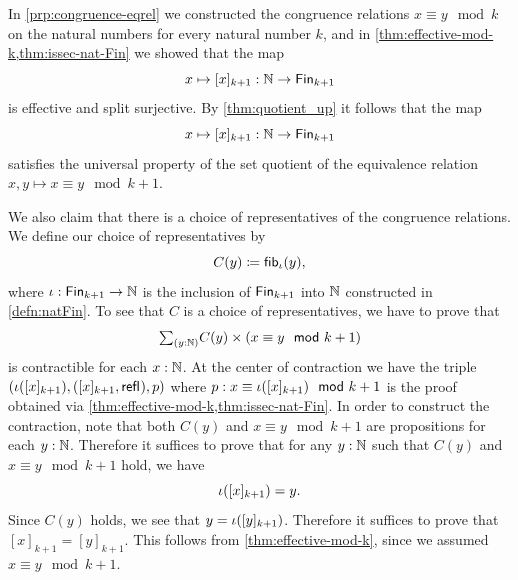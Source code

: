 \begin{eg}
  In \cref{prp:congruence-eqrel} we constructed the congruence relations $x\equiv y \mod k$ on the natural numbers for every natural number $k$, and in \cref{thm:effective-mod-k,thm:issec-nat-Fin} we showed that the map
  \begin{equation*}
    x\mapsto [x]_{k+1}:{\mathbb{N}}\to\mathsf{Fin}_{k+1}
  \end{equation*}
  is effective and split surjective. By \cref{thm:quotient_up} it follows that the map
  \begin{equation*}
    x\mapsto [x]_{k+1}:{\mathbb{N}}\to\mathsf{Fin}_{k+1}
  \end{equation*}
  satisfies the universal property of the set quotient of the equivalence relation $x,y\mapsto x\equiv y\mod k+1$.

  We also claim that there is a choice of representatives of the congruence relations. We define our choice of representatives by
  \begin{equation*}
    C(y)\coloneqq \mathsf{fib}_{\iota}(y),
  \end{equation*}
  where $\iota:\mathsf{Fin}_{k+1}\to{\mathbb{N}}$ is the inclusion of $\mathsf{Fin}_{k+1}$ into ${\mathbb{N}}$ constructed in \cref{defn:natFin}. To see that $C$ is a choice of representatives, we have to prove that
  \begin{equation*}
    \sm{y:\N}C(y)\times (x\equiv y\mod k+1)
  \end{equation*}
  is contractible for each $x:{\mathbb{N}}$. At the center of contraction we have the triple $(\iota([x]_{k+1}),([x]_{k+1},\mathsf{refl}_{}),p)$ where $p:x\equiv\iota([x]_{k+1})\ \ \mathsf{mod}\  k+1$ is the proof obtained via \cref{thm:effective-mod-k,thm:issec-nat-Fin}. In order to construct the contraction, note that both $C(y)$ and $x\equiv y\mod k+1$ are propositions for each $y:{\mathbb{N}}$. Therefore it suffices to prove that for any $y:{\mathbb{N}}$ such that $C(y)$ and $x\equiv y\mod k+1$ hold, we have
  \begin{equation*}
    \iota([x]_{k+1})=y.
  \end{equation*}
  Since $C(y)$ holds, we see that $y=\iota([y]_{k+1})$. Therefore it suffices to prove that $[x]_{k+1}=[y]_{k+1}$. This follows from \cref{thm:effective-mod-k}, since we assumed $x\equiv y\mod k+1$.
\end{eg}

